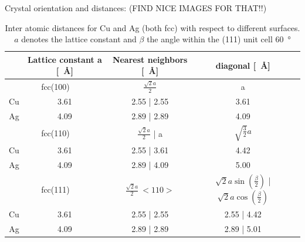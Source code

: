 Crystal orientation and distances: (FIND NICE IMAGES FOR THAT!!)
\begin{table}
\centering
\caption{Inter atomic distances for Cu and Ag (both fcc) with respect to different surfaces. $a$ denotes the lattice constant and $\beta$ the angle within the (111) unit cell \SI{60}{\degree}}
  \begin{tabular}{ccccc}
& Lattice constant a [\SI{}{\angstrom}] & Nearest neighbors [\SI{}{\angstrom}] & diagonal [\SI{}{\angstrom}]\\ \hline \hline
\multicolumn{2}{c}{fcc(100)} & $\frac{\sqrt{2}a}{2}$ & a \\
  Cu	 	& 3.61	& 2.55 | 2.55 & 3.61  \\
  Ag		& 4.09	& 2.89 | 2.89 & 4.09 \\ \hline 
\multicolumn{2}{c}{fcc(110)} & $\frac{\sqrt{2}a}{2}$ | a & $\sqrt{\frac{3}{2}}a$\\
  Cu	 	& 3.61	& 2.55 | 3.61	& 4.42 \\
  Ag		& 4.09	& 2.89 | 4.09	& 5.00 \\ \hline 
\multicolumn{2}{c}{fcc(111)} & $\frac{\sqrt{2}a}{2} \ <110>$ & $\sqrt{2}a\sin(\frac{\beta}{2})$ | $\sqrt{2}a\cos(\frac{\beta}{2})$\\
  Cu 		& 3.61	& 2.55 | 2.55	& 2.55 | 4.42 \\
  Ag		& 4.09	& 2.89 | 2.89	& 2.89 | 5.01 \\ \hline
 \end{tabular}
\end{table}

